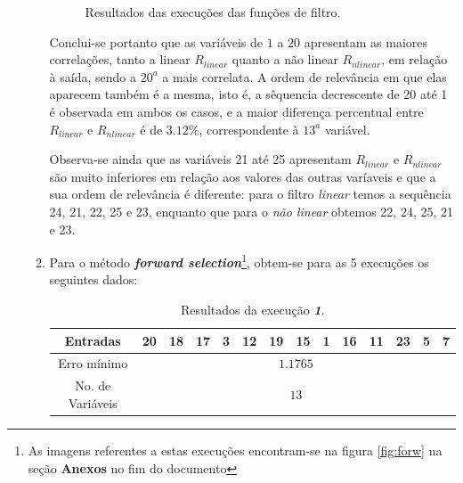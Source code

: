 \begin{enumerate}
\begin{enumerate}
\begin{figure}
				\caption{Resultados das execuções das funções de filtro.}
				\end{figure}
				
				
			\FloatBarrier
				
			Conclui-se portanto que as variáveis de \(1\) a \(20\) apresentam as maiores
			correlações, tanto a linear \(R_{linear}\) quanto a não linear \(R_{nlinear}\),
			em relação à saída, sendo a \(20^a\) a mais correlata. A ordem de relevância em
			que elas aparecem também é a mesma, isto é, a sêquencia decrescente de 20 até 1
			é observada em ambos os casos, e a maior diferença percentual entre
			\(R_{linear}\) e \(R_{nlinear}\) é de \(3.12\%\), correspondente à \(13^a\)
			variável.
				
				\vspace{12pt}
				
			Observa-se ainda que as variáveis 21 até 25 apresentam \(R_{linear}\) e
			\(R_{nlinear}\) são muito inferiores em relação aos valores das outras varíaveis
			e que a sua ordem de relevância é diferente: para o filtro \textit{linear} temos
			a sequência 24, 21, 22, 25 e 23, enquanto que para o \textit{não linear} obtemos
			22, 24, 25, 21 e 23.
			
			
			\item 
			\label{item:forwsunspot}
			Para o método \textbf{\textit{forward selection}}\footnote{As
			imagens referentes a estas execuções encontram-se na figura \ref{fig:forw}
			na seção \textbf{Anexos} no fim do documento}, obtem-se para as 5 execuções os seguintes dados:
			
			\begin{table}[H]
				    \centering
				    \footnotesize
					\caption{\label{tab:forward1_sunspot} Resultados da execução
					\textit{\textbf{1}}.}
				    \vspace{-6pt}
					\begin{tabular}{|c | c | c | c | c | c | c | c | c | c | c | c | c | c|}
					\hline
					Entradas & 20 & 18 & 17 & 3 & 12 & 19 & 15 & 1 & 16 & 11 & 23 & 5 & 7 \\
					\hline
					Erro mínimo & \multicolumn{13}{c|}{\(1.1765\)}  \\ \hline
					No. de Variáveis & \multicolumn{13}{c|}{\(13\)}  \\
					\hline
					
					\end{tabular}	    
			    \end{table}    

		\vspace{-12pt}


\end{enumerate}
\end{enumerate}
